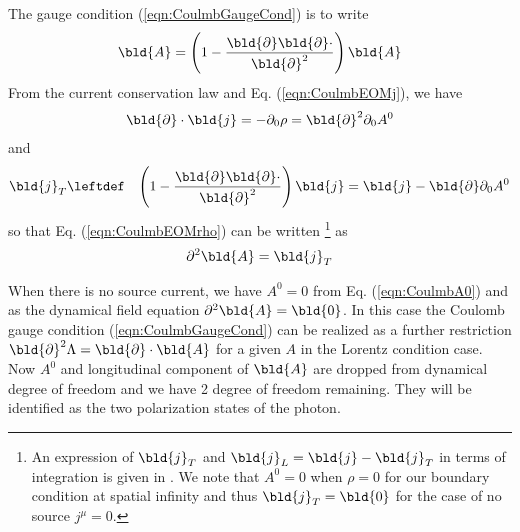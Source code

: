 The gauge condition (\ref{eqn:CoulmbGaugeCond}) is
 to write
\begin{eqnarray}
\bld{A} =
\left(
1
-
\frac{\bld{\partial} \bld{\partial} \cdot}
{\bld{\partial}^2}
\right)
\bld{A}
\label{eqn:CoulmbProjection}
\end{eqnarray}
From the current conservation law 
and Eq. (\ref{eqn:CoulmbEOMj}), we have
\begin{eqnarray}
\bld{\partial}\cdot \bld{j}
= -\partial_0 \rho
= \bld{\partial}^2 \partial_0 A^0
\end{eqnarray}
and
\begin{eqnarray}
\bld{j}_T
&\leftdef&
\left(
1 -
\frac{\bld{\partial} \bld{\partial} \cdot}
{\bld{\partial}^2}
\right)
\bld{j}
=
\bld{j} -
\bld{\partial} \partial_0 A^0
\end{eqnarray}
so that Eq. (\ref{eqn:CoulmbEOMrho}) can be written
\footnote{%
An expression of $\bld{j}_T$ and $\bld{j}_L = \bld{j} -\bld{j}_T$ in terms of integration is given in
\cite{ref:Jackson}.
We note that $A^0 = 0$ when $\rho = 0$ for our boundary condition at spatial infinity and
thus $\bld{j}_T = \bld{0}$ for the case of no source $j^\mu = 0$.
}%
 as
\begin{eqnarray}
\partial^2 \bld{A}
=
\bld{j}_T
\end{eqnarray}

When there is no source current, we have $A^0 = 0$ from Eq. (\ref{eqn:CoulmbA0}) and
as the dynamical field equation $\partial^2 \bld{A}  = \bld{0}$.
In this case the Coulomb gauge condition (\ref{eqn:CoulmbGaugeCond}) can be
realized as a further restriction $\bld{\partial}^2 \Lambda = \bld{\partial} \cdot \bld{A}$ for a
given $A$ in the Lorentz condition case.
Now $A^0$ and longitudinal component of $\bld{A}$ are dropped from dynamical degree of
freedom and we have 2 degree of freedom remaining. They will be identified as the two
polarization states of the photon.

